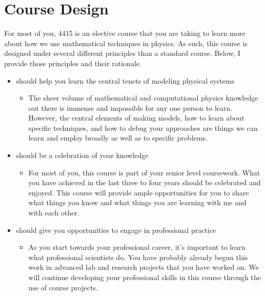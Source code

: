\documentclass[letterpaper,10pt,english]{jupyterBook}
\begin{document}
\sphinxstepscope


\section{Course Design}
\label{\detokenize{content/0_course/design:course-design}}\label{\detokenize{content/0_course/design::doc}}
\sphinxAtStartPar
For most of you, 4415 is an elective course that you are taking to learn more about how we use mathematical techniques in physics. As such, this course is designed under several different principles than a standard course. Below, I provide those principles and their rationale.
\begin{itemize}
\item {} 
 should help you learn the central tenets of modeling physical systems
\begin{itemize}
\item {} 
\sphinxAtStartPar
The sheer volume of mathematical and computational physics knowledge out there is immense and impossible for any one person to learn. However, the central elements of making models, how to learn about specific techniques, and how to debug your approaches are things we can learn and employ broadly as well as to specific problems.

\end{itemize}

\item {} 
 should be a celebration of your knowledge
\begin{itemize}
\item {} 
\sphinxAtStartPar
For most of you, this course is part of your senior level coursework. What you have achieved in the last three to four years should be celebrated and enjoyed. This course will provide ample opportunities for you to share what things you know and what things you are learning with me and with each other.

\end{itemize}

\item {} 
 should give you opportunities to engage in professional practice
\begin{itemize}
\item {} 
\sphinxAtStartPar
As you start towards your professional career, it’s important to learn what professional scientists do. You have probably already begun this work in advanced lab and research projects that you have worked on. We will continue developing your professional skills in this course through the use of course projects.


\end{itemize}
\end{itemize}
\end{document}
